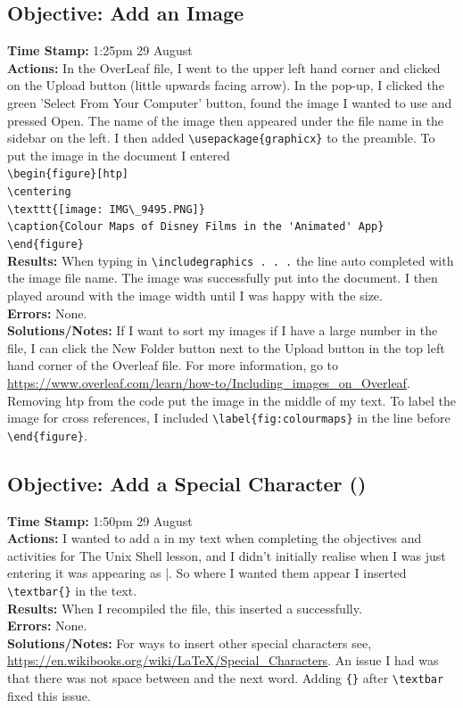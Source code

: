 \documentclass{article}
\begin{document}
\begin{FlushLeft}
\subsection{Objective: Add an Image}
\textbf{Time Stamp:} 1:25pm 29 August\\
\textbf{Actions:} In the OverLeaf file, I went to the upper left hand corner and clicked on the Upload button (little upwards facing arrow). In the pop-up, I clicked the green 'Select From Your Computer' button, found the image I wanted to use and pressed Open. The name of the image then appeared under the file name in the sidebar on the left. I then added \verb|\usepackage{graphicx}| to the preamble. To put the image in the document I entered \\
\verb|\begin{figure}[htp]| \\
\verb|\centering|\\
\verb|\texttt{[image: IMG\_9495.PNG]}|\\
\verb|\caption{Colour Maps of Disney Films in the 'Animated' App}|\\
\verb|\end{figure}|\\
\textbf{Results:} When typing in \verb|\includegraphics . . .| the line auto completed with the image file name. The image was successfully put into the document. I then played around with the image width until I was happy with the size.\\
\textbf{Errors:} None.\\
\textbf{Solutions/Notes:} If I want to sort my images if I have a large number in the file, I can click the New Folder button next to the Upload button in the top left hand corner of the Overleaf file. For more information, go to \url{https://www.overleaf.com/learn/how-to/Including_images_on_Overleaf}. Removing htp from the code put the image in the middle of my text. To label the image for cross references, I included \verb|\label{fig:colourmaps}| in the line before \verb|\end{figure}|.

\subsection{Objective: Add a Special Character (\textbar{})}\label{sec:space}
\textbf{Time Stamp:} 1:50pm 29 August\\
\textbf{Actions:} I wanted to add a \textbar{} in my text when completing the objectives and activities for The Unix Shell lesson, and I didn't initially realise when I was just entering \textbar{} it was appearing as |. So where I wanted them appear I inserted \verb|\textbar{}| in the text. \\
\textbf{Results:} When I recompiled the file, this inserted a \textbar{} successfully.\\
\textbf{Errors:} None.\\
\textbf{Solutions/Notes:} For ways to insert other special characters see, \url{https://en.wikibooks.org/wiki/LaTeX/Special_Characters}. An issue I had was that there was not space between \textbar{} and the next word. Adding \verb|{}| after \verb|\textbar| fixed this issue.


\end{FlushLeft}
\end{document}

